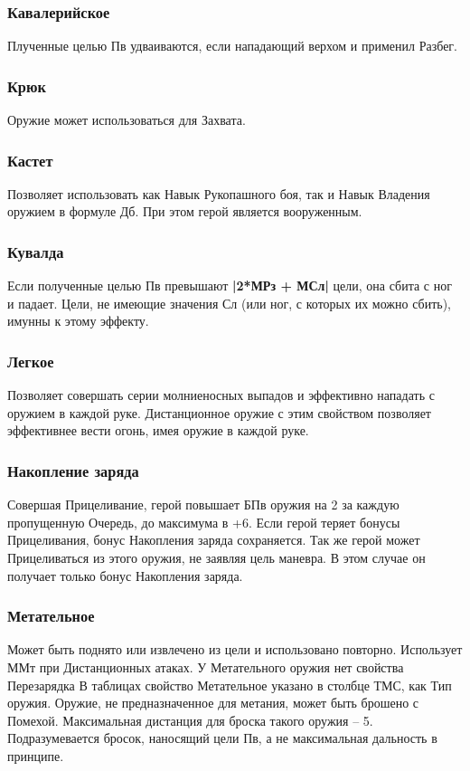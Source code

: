 \subsubsection{Кавалерийское} Плученные целью Пв удваиваются, если нападающий верхом и применил Разбег.
\subsubsection{Крюк} Оружие может использоваться для Захвата.
\subsubsection{Кастет} Позволяет использовать как Навык Рукопашного боя, так и Навык Владения оружием в формуле Дб. При этом герой является вооруженным.
\subsubsection{Кувалда} Если полученные целью Пв превышают \textbf{|2*МРз + МСл|} цели, она сбита с ног и падает. Цели, не имеющие значения Сл (или ног, с которых их можно сбить), имунны к этому эффекту. 
\subsubsection{Легкое} Позволяет совершать серии молниеносных выпадов и эффективно нападать с оружием в каждой руке.
\newline Дистанционное оружие с этим свойством позволяет эффективнее вести огонь, имея оружие в каждой руке.
\subsubsection{Накопление заряда} Совершая Прицеливание, герой повышает БПв оружия на 2 за каждую пропущенную Очередь, до максимума в +6. Если герой теряет бонусы Прицеливания, бонус Накопления заряда сохраняется. 
\newline Так же герой может Прицеливаться из этого оружия, не заявляя цель маневра. В этом случае он получает только бонус Накопления заряда.
\subsubsection{Метательное} Может быть поднято или извлечено из цели и использовано повторно. Использует ММт при Дистанционных атаках. 
\newline У Метательного оружия нет свойства Перезарядка 
\newline В таблицах свойство Метательное указано в столбце ТМС, как Тип оружия.
\newline Оружие, не предназначенное для метания, может быть брошено с Помехой. Максимальная дистанция для броска такого оружия – 5. Подразумевается бросок, наносящий цели Пв, а не максимальная дальность в принципе.
